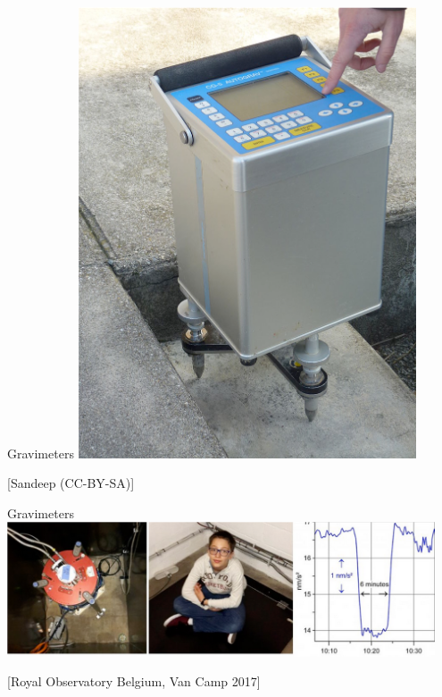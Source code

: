 \begin{frame}
  \begin{PointSix}{Gravimeters}
    \includegraphics[width=0.75\textwidth]{Figures/Gravity/Exported/Gravimeter_Sandeep_CC_BY_SA.png}

    \tiny [Sandeep (CC-BY-SA)]
  \end{PointSix}
\end{frame}


\begin{frame}
  \begin{PointSix}{Gravimeters}
    \includegraphics[width=0.95\textwidth]{Figures/Gravity/Exported/GravimetryNoHide_RoyalObsVanCamp2017.png}

    \tiny [Royal Observatory Belgium, Van Camp 2017]
  \end{PointSix}
\end{frame}

